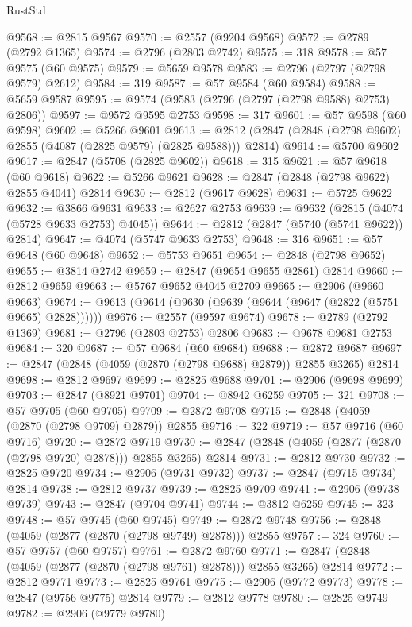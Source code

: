 \begin{lexlean}{RustStd}
\begin{coremodule}
@9568 := @2815 @9567
@9570 := @2557 (@9204 @9568)
@9572 := @2789 (@2792 @1365)
@9574 := @2796 (@2803 @2742)
@9575 := 318
@9578 := @57 @9575 (@60 @9575)
@9579 := @5659 @9578
@9583 := @2796 (@2797 (@2798 @9579) @2612)
@9584 := 319
@9587 := @57 @9584 (@60 @9584)
@9588 := @5659 @9587
@9595 := @9574 (@9583 (@2796 (@2797 (@2798 @9588) @2753) @2806))
@9597 := @9572 @9595 @2753
@9598 := 317
@9601 := @57 @9598 (@60 @9598)
@9602 := @5266 @9601
@9613 := @2812 (@2847 (@2848 (@2798 @9602) @2855 (@4087 (@2825 @9579) (@2825 @9588))) @2814)
@9614 := @5700 @9602
@9617 := @2847 (@5708 (@2825 @9602))
@9618 := 315
@9621 := @57 @9618 (@60 @9618)
@9622 := @5266 @9621
@9628 := @2847 (@2848 (@2798 @9622) @2855 @4041) @2814
@9630 := @2812 (@9617 @9628)
@9631 := @5725 @9622
@9632 := @3866 @9631
@9633 := @2627 @2753
@9639 := @9632 (@2815 (@4074 (@5728 @9633 @2753) @4045))
@9644 := @2812 (@2847 (@5740 (@5741 @9622)) @2814)
@9647 := @4074 (@5747 @9633 @2753)
@9648 := 316
@9651 := @57 @9648 (@60 @9648)
@9652 := @5753 @9651
@9654 := @2848 (@2798 @9652)
@9655 := @3814 @2742
@9659 := @2847 (@9654 @9655 @2861) @2814
@9660 := @2812 @9659
@9663 := @5767 @9652 @4045 @2709
@9665 := @2906 (@9660 @9663)
@9674 := @9613 (@9614 (@9630 (@9639 (@9644 (@9647 (@2822 (@5751 @9665) @2828))))))
@9676 := @2557 (@9597 @9674)
@9678 := @2789 (@2792 @1369)
@9681 := @2796 (@2803 @2753) @2806
@9683 := @9678 @9681 @2753
@9684 := 320
@9687 := @57 @9684 (@60 @9684)
@9688 := @2872 @9687
@9697 := @2847 (@2848 (@4059 (@2870 (@2798 @9688) @2879)) @2855 @3265) @2814
@9698 := @2812 @9697
@9699 := @2825 @9688
@9701 := @2906 (@9698 @9699)
@9703 := @2847 (@8921 @9701)
@9704 := @8942 @6259
@9705 := 321
@9708 := @57 @9705 (@60 @9705)
@9709 := @2872 @9708
@9715 := @2848 (@4059 (@2870 (@2798 @9709) @2879)) @2855
@9716 := 322
@9719 := @57 @9716 (@60 @9716)
@9720 := @2872 @9719
@9730 := @2847 (@2848 (@4059 (@2877 (@2870 (@2798 @9720) @2878))) @2855 @3265) @2814
@9731 := @2812 @9730
@9732 := @2825 @9720
@9734 := @2906 (@9731 @9732)
@9737 := @2847 (@9715 @9734) @2814
@9738 := @2812 @9737
@9739 := @2825 @9709
@9741 := @2906 (@9738 @9739)
@9743 := @2847 (@9704 @9741)
@9744 := @3812 @6259
@9745 := 323
@9748 := @57 @9745 (@60 @9745)
@9749 := @2872 @9748
@9756 := @2848 (@4059 (@2877 (@2870 (@2798 @9749) @2878))) @2855
@9757 := 324
@9760 := @57 @9757 (@60 @9757)
@9761 := @2872 @9760
@9771 := @2847 (@2848 (@4059 (@2877 (@2870 (@2798 @9761) @2878))) @2855 @3265) @2814
@9772 := @2812 @9771
@9773 := @2825 @9761
@9775 := @2906 (@9772 @9773)
@9778 := @2847 (@9756 @9775) @2814
@9779 := @2812 @9778
@9780 := @2825 @9749
@9782 := @2906 (@9779 @9780)

\end{coremodule}
\end{lexlean}
